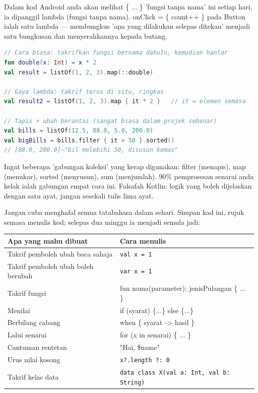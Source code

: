 
Dalam kod Android anda akan melihat \{ ... \} 'fungsi tanpa nama' ini setiap hari; ia dipanggil lambda (fungsi tanpa nama). onClick = \{ count++ \} pada Button ialah satu lambda — membungkus 'apa yang dilakukan selepas ditekan' menjadi satu bungkusan dan menyerahkannya kepada butang.

\begin{lstlisting}[language=Kotlin]
// Cara biasa: takrifkan fungsi bernama dahulu, kemudian hantar
fun double(x: Int) = x * 2
val result = listOf(1, 2, 3).map(::double)

// Gaya lambda: takrif terus di situ, ringkas
val result2 = listOf(1, 2, 3).map { it * 2 }   // it = elemen semasa

// Tapis + ubah berantai (sangat biasa dalam projek sebenar)
val bills = listOf(12.5, 88.0, 5.0, 200.0)
val bigBills = bills.filter { it > 50 }.sorted()
// [88.0, 200.0]—"bil melebihi 50, disusun kemas"
\end{lstlisting}

Ingat beberapa 'gabungan koleksi' yang kerap digunakan: filter (menapis), map (menukar), sorted (menyusun), sum (menjumlah). 90\% pemprosesan senarai anda kelak ialah gabungan empat cara ini. Falsafah Kotlin: logik yang boleh dijelaskan dengan satu ayat, jangan sesekali tulis lima ayat.


Jangan cuba menghafal semua tatabahasa dalam sehari. Simpan kad ini, rujuk semasa menulis kod; selepas dua minggu ia menjadi semula jadi:

\begin{center}
\begin{tabularx}{\linewidth}{|X|X|}
\hline
\textbf{Apa yang mahu dibuat} & \textbf{Cara menulis} \tabularnewline
\hline
Takrif pemboleh ubah baca sahaja & \texttt{val x = 1} \tabularnewline
Takrif pemboleh ubah boleh berubah & \texttt{var x = 1} \tabularnewline
Takrif fungsi & fun nama(parameter): jenisPulangan \{ ... \} \tabularnewline
Menilai & if (syarat) \{...\} else \{...\} \tabularnewline
Berbilang cabang & when \{ syarat -> hasil \} \tabularnewline
Lalui senarai & for (x in senarai) \{ ... \} \tabularnewline
Cantuman rentetan & "Hai, \$name" \tabularnewline
Urus nilai kosong & \texttt{x?.\allowbreak length ?: 0} \tabularnewline
Takrif kelas data & \texttt{data class X(val a: Int, val b: String)} \tabularnewline
\hline
\end{tabularx}
\end{center}

